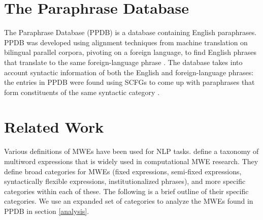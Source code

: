 \documentclass[11pt]{article}
\begin{document}
\section{The Paraphrase Database}

The Paraphrase Database (PPDB) is a database containing English paraphrases. PPDB was developed using alignment techniques from machine translation on bilingual parallel corpora, pivoting on a foreign language, to find English phrases that translate to the same foreign-language phrase . The database takes into account syntactic information of both the English and foreign-language phrases: the entries in PPDB were found using SCFGs to come up with paraphrases that form constituents of the same syntactic category \cite{ganitkevitch-EtAl:2011:EMNLP,ganitkevitch-vandurme-callisonburch:2013:NAACL-HLT}.

\section{Related Work}

Various definitions of MWEs have been used for NLP tasks.  define a taxonomy of multiword expressions that is widely used in computational MWE research. They define broad categories for MWEs (fixed expressions, semi-fixed expressions, syntactically flexible expressions, institutionalized phrases), and more specific categories within each of these. The following is a brief outline of their specific categories.   We use an expanded set of categories to analyze the MWEs found in PPDB in section \ref{analysis}.
\end{document}
